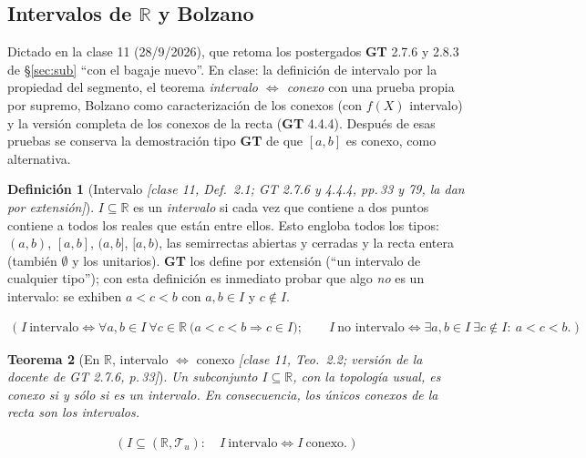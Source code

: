 \documentclass[11pt,a4paper]{article}
\newcommand{\lgc}[1]{\par\vspace{-3pt}\begin{gather*}\big(\;#1\;\big)\end{gather*}\vspace{-6pt}}
\theoremstyle{definition}
\newtheorem{definicion}{Definición}[section]
\theoremstyle{plain}
\newtheorem{teorema}[definicion]{Teorema}
\newcommand{\fnt}[1]{{\normalfont\small\itshape\color{gray!150!black}[#1]}}
\newcommand{\R}{\mathbb{R}}
\newcommand{\tp}{\mathcal{T}}
\begin{document}
\subsection{Intervalos de $\R$ y Bolzano}\label{sec:bolzano}

\noindent Dictado en la clase 11 (28/9/2026), que retoma los postergados \textbf{GT} 2.7.6 y 2.8.3 de \S\ref{sec:sub} ``con el bagaje nuevo''. En clase: la definición de intervalo por la propiedad del segmento, el teorema \emph{intervalo $\iff$ conexo} con una prueba propia por supremo, Bolzano como caracterización de los conexos (con $f(X)$ intervalo) y la versión completa de los conexos de la recta (\textbf{GT} 4.4.4). Después de esas pruebas se conserva la demostración tipo \textbf{GT} de que $[a,b]$ es conexo, como alternativa.

\begin{definicion}[Intervalo \fnt{clase 11, Def.\ 2.1; GT 2.7.6 y 4.4.4, pp.\,33 y 79, la dan por extensión}]\label{def:intervalo}
$I\subseteq\R$ es un \emph{intervalo} si cada vez que contiene a dos puntos contiene a todos los reales que están entre ellos. Esto engloba todos los tipos: $(a,b)$, $[a,b]$, $(a,b]$, $[a,b)$, las semirrectas abiertas y cerradas y la recta entera (también $\emptyset$ y los unitarios). \textbf{GT} los define por extensión (``un intervalo de cualquier tipo''); con esta definición es inmediato probar que algo \emph{no} es un intervalo: se exhiben $a<c<b$ con $a,b\in I$ y $c\notin I$.
\lgc{I\ \text{intervalo}\iff \forall a,b\in I\ \forall c\in\R\ \big(a<c<b\Rightarrow c\in I\big);\qquad I\ \text{no intervalo}\iff \exists a,b\in I\ \exists c\notin I:\ a<c<b.}
\end{definicion}

\begin{teorema}[En $\R$, intervalo $\iff$ conexo \fnt{clase 11, Teo.\ 2.2; versión de la docente de GT 2.7.6, p.\,33}]\label{th:intconex}
Un subconjunto $I\subseteq\R$, con la topología usual, es conexo si y sólo si es un intervalo. En consecuencia, los únicos conexos de la recta son los intervalos.
\lgc{I\subseteq(\R,\tp_u):\quad I\ \text{intervalo}\iff I\ \text{conexo}.}
\end{teorema}
\end{document}
